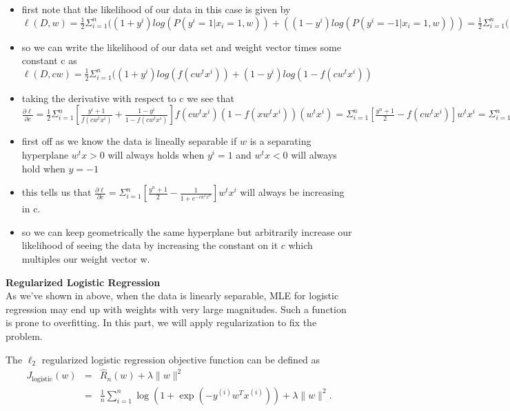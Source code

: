 \documentclass{article}
\newcommand{\nyuparagraph}[1]{\vspace{0.3cm}\textcolor{nyupurple}{\bf \large #1}\\}
\theoremstyle{plain}
\theoremstyle{definition}
\begin{document}
\begin{enumerate}
\begin{itemize}
    \color{blue}
    \item first note that the likelihood of our data in this case is given by $\ell(D,w)=\frac{1}{2}\Sigma_{i=1}^{n}( (1+y^i)log(P(y^i=1|x_i=1,w)) +((1-y^i)log(P(y^i=-1|x_i=1,w)))=\frac{1}{2}\Sigma_{i=1}^{n}((1+y^i)log(f(w^tx^i))+(1-y^i)log(1-f(w^tx^i))$
    \item so we can write the likelihood of our data set and weight vector times some constant c as $\ell(D,cw)=\frac{1}{2}\Sigma_{i=1}^{n}((1+y^i)log(f(cw^tx^i))+(1-y^i)log(1-f(cw^tx^i))$
    \item taking the derivative with respect to c we see that $\frac{\partial \ell}{\partial c}=\frac{1}{2}\Sigma_{i=1}^{n}[\frac{y^i+1}{f(cw^tx^i)} +\frac{1-y^i}{1-f(cw^tx^i)}]f(cw^tx^i)(1-f(xw^tx^i))(w^tx^i)=\Sigma_{i=1}^{n}[\frac{y^n+1}{2}-f(cw^tx^i)]w^tx^i=\Sigma_{i=1}^{n}[\frac{y^n+1}{2}-\frac{1}{1+e^{-cw^tx^n}}]w^tx^i$
    \item first off as we know the data is lineally separable if $w$ is a separating hyperplane $w^tx>0$ will always holds when $y^{i}=1$ and $w^{t}x<0$ will always hold when $y=-1$ 
    \item this tells us that  $\frac{\partial \ell}{\partial c}=\Sigma_{i=1}^{n}[\frac{y^n+1}{2}-\frac{1}{1+e^{-cw^tx^n}}]w^tx^i$ will always be increasing in c. 
    \item so we can keep geometrically the same hyperplane but arbitrarily increase our likelihood of seeing the data by increasing the constant on it $c$ which multiples our weight vector w.  
\end{itemize}


\setcounter{saveenum}{\value{enumi}}
\end{enumerate}

\nyuparagraph{\label{subsec:Regularized-Logistic-Regression}Regularized Logistic
Regression}
As we've shown in above, when the data is linearly separable,
MLE for logistic regression may end up with weights with very large magnitudes. Such a function is prone to overfitting.
In this part, we will apply regularization to fix the problem.

The $\ell_2$ regularized
logistic regression objective function can be defined as
\begin{eqnarray*}
J_{\text{logistic}}(w) & = & \hat{R}_{n}(w)+\lambda\|w\|^{2}\\
 & = & \frac{1}{n}\sum_{i=1}^{n}\log\left(1+\exp\left(-y^{(i)}w^{T}x^{(i)}\right)\right)+\lambda\|w\|^{2}.
\end{eqnarray*}
 
\end{document}
